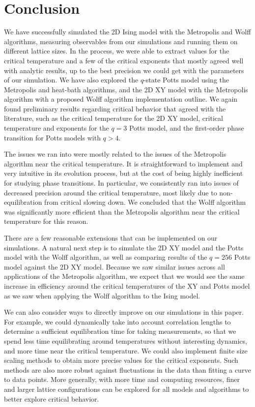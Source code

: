 \documentclass[twocolumn,aps]{revtex4-1} %
\begin{document}
\section{Conclusion}
We have successfully simulated the 2D Ising model with the Metropolis and Wolff algorithms, measuring observables from our simulations and running them on different lattice sizes. In the process, we were able to extract values for the critical temperature and a few of the critical exponents that mostly agreed well with analytic results, up to the best precision we could get with the parameters of our simulation. We have also explored the $q$-state Potts model using the Metropolis and heat-bath algorithms, and the 2D XY model with the Metropolis algorithm with a proposed Wolff algorithm implementation outline. We again found preliminary results regarding critical behavior that agreed with the literature, such as the critical temperature for the 2D XY model, critical temperature and exponents for the $q = 3$ Potts model, and the first-order phase transition for Potts models with $q > 4$.

The issues we ran into were mostly related to the issues of the Metropolis algorithm near the critical temperature. It is straightforward to implement and very intuitive in its evolution process, but at the cost of being highly inefficient for studying phase transitions. In particular, we consistently ran into issues of decreased precision around the critical temperature, most likely due to non-equilibration from critical slowing down. We concluded that the Wolff algorithm was significantly more efficient than the Metropolis algorithm near the critical temperature for this reason.

There are a few reasonable extensions that can be implemented on our simulations. A natural next step is to simulate the 2D XY model and the Potts model with the Wolff algorithm, as well as comparing results of the $q = 256$ Potts model against the 2D XY model. Because we saw similar issues across all applications of the Metropolis algorithm, we expect that we would see the same increase in efficiency around the critical temperatures of the XY and Potts model as we saw when applying the Wolff algorithm to the Ising model.

We can also consider ways to directly improve on our simulations in this paper. For example, we could dynamically take into account correlation lengths to determine a sufficient equilibration time for taking measurements, so that we spend less time equilibrating around temperatures without interesting dynamics, and more time near the critical temperature. We could also implement finite size scaling methods to obtain more precise values for the critical exponents. Such methods are also more robust against fluctuations in the data than fitting a curve to data points. More generally, with more time and computing resources, finer and larger lattice configurations can be explored for all models and algorithms to better explore critical behavior.
\end{document}
